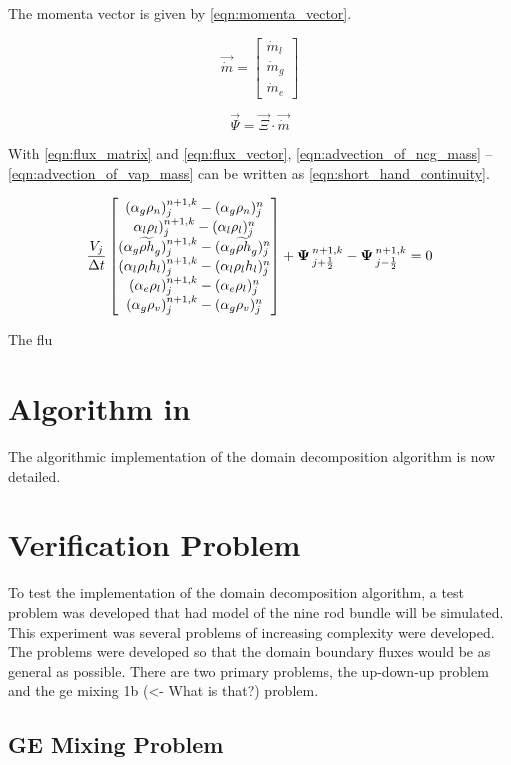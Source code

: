 The momenta vector is given by \eqref{eqn:momenta_vector}.

\begin{equation}
\label{eqn:momenta_vector}
\vec{\dot{m}} = \begin{bmatrix}
\dot{m}_{l} \\
\dot{m}_{g} \\
\dot{m}_{e}
\end{bmatrix}
\end{equation}

\begin{equation}
\label{eqn:flux_vector}
\vec{\Psi} = \vec{\Xi} \cdot \vec{\dot{m}}
\end{equation}


With \eqref{eqn:flux_matrix} and \eqref{eqn:flux_vector}, \eqref{eqn:advection_of_ncg_mass} -- \eqref{eqn:advection_of_vap_mass} can be written as \eqref{eqn:short_hand_continuity}.

\begin{equation}
\label{eqn:short_hand_continuity}
\frac{V_j}{\dt} \begin{bmatrix}
(\alpha_{g} \rho_{n})^{n+1, k}_{j} - (\alpha_{g} \rho_{n})^{n}_{j} \\
\alpha_{l} \rho_{l})^{n+1, k}_{j} - (\alpha_{l} \rho_{l})^{n}_{j} \\
(\alpha_{g} \widetilde{\rho h}_{g})^{n+1, k}_{j} - (\alpha_{g} \widetilde{\rho h}_{g})^{n}_{j}  \\
(\alpha_{l} \rho_{l} h_{l})^{n+1, k}_{j} - (\alpha_{l} \rho_{l} h_{l} )^{n}_{j} \\
(\alpha_{e} \rho_{l})^{n+1, k}_{j} - (\alpha_{e} \rho_{l})^{n}_{j} \\
(\alpha_{g} \rho_{v})^{n+1, k}_{j} - (\alpha_{g} \rho_{v})^{n}_{j} 
\end{bmatrix} + \vec{\Psi}^{n+1, k}_{j + \frac{1}{2}} - \vec{\Psi}^{n+1, k}_{j - \frac{1}{2}}= 0
\end{equation}

The flu

\section{Algorithm in \cobra{}}
\label{sec:dd:algo}

The algorithmic implementation of the domain decomposition algorithm is now detailed.

\section{Verification Problem}
\label{sec:dd:verify}
To test the implementation of the domain decomposition algorithm, a test problem was developed that had model of the nine rod bundle will be simulated. 
This experiment was several problems of increasing complexity were developed.
The problems were developed so that the domain boundary fluxes would be as general as possible.
There are two primary problems, the up-down-up problem and the ge mixing 1b (<- What is that?) problem.

\subsection{GE Mixing Problem}
\label{ss:dd:ver:gem}




